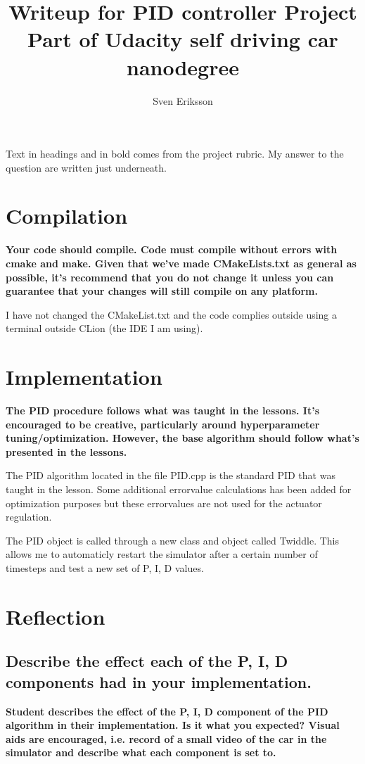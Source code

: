 \documentclass[12pt,a4paper]{article}
\author{Sven Eriksson}
\title{Writeup for PID controller Project \\ \large{Part of Udacity self driving car nanodegree}}
\begin{document}
\maketitle


Text in headings and in bold comes from the project rubric. My answer to the question are written just underneath.

\section{Compilation}
\textbf{Your code should compile. Code must compile without errors with cmake and make. Given that we've made CMakeLists.txt as general as possible, it's recommend that you do not change it unless you can guarantee that your changes will still compile on any platform. }

I have not changed the CMakeList.txt and the code complies outside using a terminal outside CLion (the IDE I am using).

\section{Implementation}
\textbf{The PID procedure follows what was taught in the lessons. It's encouraged to be creative, particularly around hyperparameter tuning/optimization. However, the base algorithm should follow what's presented in the lessons.}

The PID algorithm located in the file PID.cpp is the standard PID that was taught in the lesson. Some additional errorvalue calculations has been added for optimization purposes but these errorvalues are not used for the actuator regulation.

The PID object is called through a new class and object called Twiddle. This allows me to automaticly restart the simulator after a certain number of timesteps and test a new set of P, I, D values.

\section{Reflection}
\subsection{Describe the effect each of the P, I, D components had in your implementation.}
\textbf{Student describes the effect of the P, I, D component of the PID algorithm in their implementation. Is it what you expected? Visual aids are encouraged, i.e. record of a small video of the car in the simulator and describe what each component is set to. }
\end{document}
